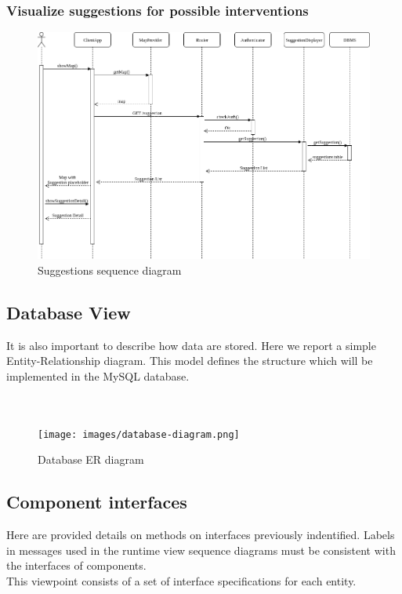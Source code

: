 \documentclass{article}
\begin{document}
\newpage
\subsubsection{Visualize suggestions for possible interventions}
\begin{figure}[!htb]
\centering
	\includegraphics[width=1.0\textwidth]{images/visualize-suggestion-sequence.png}
	\caption{Suggestions sequence diagram}
	\label{fig:visualize-suggestion-sequence}
\end{figure}

\clearpage
\subsection{Database View}
It is also important to describe how data are stored.
Here we report a simple Entity-Relationship diagram. 
This model defines the structure which will be implemented in the MySQL database.\\ \\ \\
\begin{figure}[!htb]
	\centering
		\texttt{[image: images/database-diagram.png]}
		\caption{Database ER diagram}
	\end{figure}

\newpage
\subsection{Component interfaces}
Here are provided details on methods on interfaces previously indentified. Labels in messages used in the runtime view sequence diagrams must be consistent with the interfaces of components.
\\
This viewpoint consists of a set of interface specifications for each entity.
\end{document}
